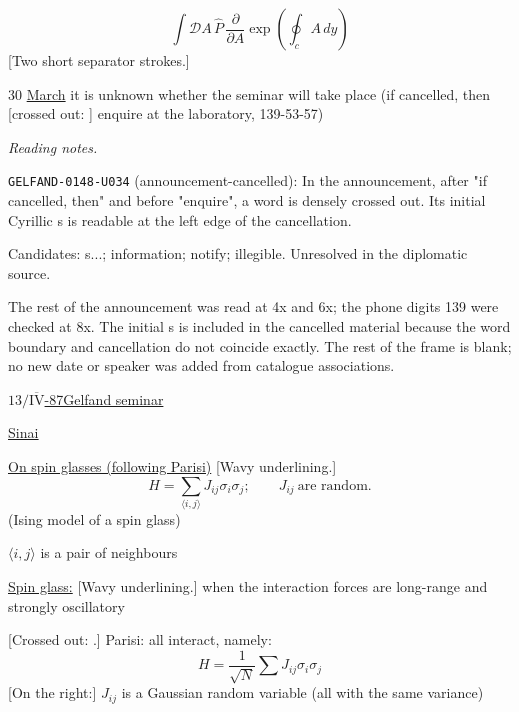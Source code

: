 \begin{equation*}
\int\mathcal D A\,\hat P\,\frac{\partial}{\partial A}
\exp\left(\oint_c A\,dy\right) \tag{26}
\end{equation*}
[Two short separator strokes.]

30 \underline{March} it is unknown whether the seminar will take place
(if cancelled, then
[crossed out: ]
enquire at the laboratory, 139-53-57)


\par\smallskip\noindent\textit{Reading notes.}\par
\noindent\texttt{GELFAND-0148-U034} (announcement-cancelled): In the announcement, after "if cancelled, then" and before "enquire", a word is densely crossed out. Its initial Cyrillic s is readable at the left edge of the cancellation.\par
Candidates: s...; information; notify; illegible. Unresolved in the diplomatic source.\par
The rest of the announcement was read at 4x and 6x; the phone digits 139 were checked at 8x. The initial s is included in the cancelled material because the word boundary and cancellation do not coincide exactly. The rest of the frame is blank; no new date or speaker was added from catalogue associations.\par


\underline{$13/\overline{\mathrm{IV}}$-87}\quad \underline{Gelfand seminar}

\underline{\underline{Sinai}}

\underline{On spin glasses (following Parisi)}
[Wavy underlining.]
\begin{equation*}
H=\sum_{\langle i,j\rangle}J_{ij}\sigma_i\sigma_j;\qquad
J_{ij}\ \text{are random}. \tag{1}
\end{equation*}
(Ising model of a spin glass)

$\langle i,j\rangle$ is a pair of neighbours

\underline{Spin glass:} [Wavy underlining.]
when the interaction forces are long-range and strongly oscillatory

[Crossed out: .]
Parisi: all interact, namely:
\begin{equation*}
H=\frac1{\sqrt N}\sum J_{ij}\sigma_i\sigma_j \tag{2}
\end{equation*}
[On the right:] $J_{ij}$ is a Gaussian random variable
(all with the same variance)

